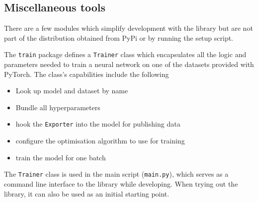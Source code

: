 \hypertarget{sec:other-tools}{%
\subsection{Miscellaneous tools}\label{sec:other-tools}}

There are a few modules which simplify development with the library but are not
part of the distribution obtained from PyPi or by running the setup script.

The \texttt{train} package defines a \texttt{Trainer} class which encapsulates
all the logic and parameters needed to train a neural network on one of the
datasets provided with PyTorch. The class's capabilities include the following

\begin{itemize}
    \item
        Look up model and dataset by name
    \item
        Bundle all hyperparameters
    \item
        hook the \texttt{Exporter} into the model for
        publishing data
    \item
        configure the optimisation algorithm to use for training
    \item
        train the model for one batch
\end{itemize}

The \texttt{Trainer} class is used in the main script (\texttt{main.py}), which
serves as a command line interface to the library while developing. When trying
out the library, it can also be used as an initial starting point.

